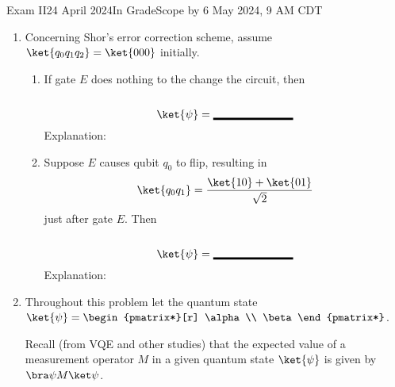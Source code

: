 \documentclass[12pt]{article}
\newcommand{\Blank}[1][1in]{\mbox{\vrule width #1 depth 2pt}\vrule width 0pt height 2.2em}
\def\SQB#1#2{%
\ensuremath{%
\begin{pmatrix*}[r] #1 \\ #2\end{pmatrix*}}}
\begin{document}
\begin{assignment}{Exam II}{24 April 2024}{In GradeScope by 6 May 2024, 9 AM CDT}
\begin{enumerate}
\begin{itemize}
\begin{itemize}
    \Blank[3in]{}

    \item If $U$ is also its own conjugate transpose ($U=U^\star$), what circuit also corresponds to the inverse of $U$?\Blank[3in]{}
    \end{itemize}
\end{itemize}

\clearpage\item{}
Concerning Shor's error correction scheme, assume $\ket{q_{0}q_{1}q_{2}}=\ket{000}$ initially.
\begin{center}
\end{center}

\begin{enumerate}
    \item{} If gate $E$ does nothing to the change the circuit, then
    \[
    \ket{\psi} = \Blank{}
    \]
    Explanation:
    \LeaveSpace{1in}
    \item{} Suppose $E$ causes qubit $q_0$ to flip, resulting in
    \[
    \ket{q_{0}q_{1}} = \frac{\ket{10}+\ket{01}}{\sqrt{2}}
    \]
    just after gate $E$.  Then
        \[
    \ket{\psi} = \Blank{}
    \]
    Explanation:
    \LeaveSpace{1in}
\end{enumerate}

\clearpage\item{}
Throughout this problem let the quantum state
\( \ket{\psi} = \SQB{\alpha}{\beta} \).

Recall (from VQE and other studies) that the expected value of a measurement operator $M$ in a given quantum state $\ket{\psi}$ is given by
\( \ExpVal{M}{\psi} \).


\end{enumerate}
\end{assignment}
\end{document}
